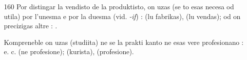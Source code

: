 \begin{VUpage}[164]{160}
Por distingar la vendisto de la produktisto, on uzas (se\nl
to esas necesa od utila)  por l'unesma e  por\nl
la duesma (vid. \textit{-if}) :  (lu fabrikas), \nl
(lu vendas); od on precizigas altre : \cc
{}.

Kompreneble on uzas  (studiita) ne  se la prakti\cc
kanto ne esas vere profesionano : \nl
{} e. c. (ne profesione); \cc
{} (kurista),  (profesione).
\end{VUpage}

